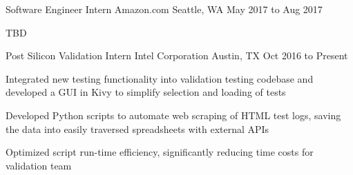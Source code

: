\begin{cventries}
  \cventry
    {Software Engineer Intern}
    {Amazon.com}
    {Seattle, WA}
    {May 2017 to Aug 2017}
    {
      \begin{cvitems}
        \item {TBD}
      \end{cvitems}
    }
  \cventry
    {Post Silicon Validation Intern}
    {Intel Corporation}
    {Austin, TX}
    {Oct 2016 to Present}
    {
      \begin{cvitems}
        \item {Integrated new testing functionality into validation testing codebase and developed a GUI in Kivy to simplify selection and loading of tests}
        \item {Developed Python scripts to automate web scraping of HTML test logs, saving the data into easily traversed spreadsheets with external APIs}
        \item {Optimized script run-time efficiency, significantly reducing time costs for validation team}
      \end{cvitems}
    }
\end{cventries}
